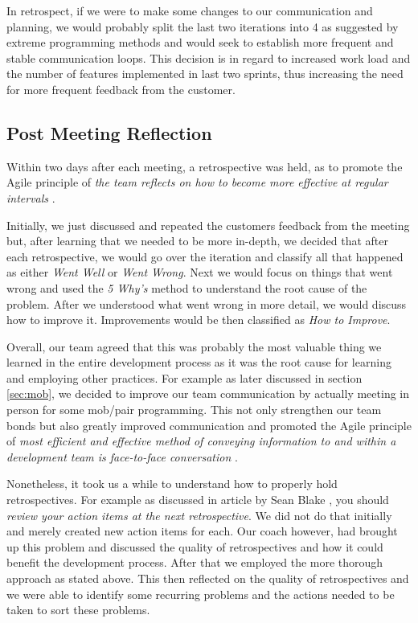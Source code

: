 \documentclass{l3proj}
\begin{document}
        In retrospect, if we were to make some changes to our communication and planning, we would probably split the last two iterations into 4 as suggested by extreme programming methods \cite{ep} and would seek to establish more frequent and stable communication loops. This decision is in regard to increased work load and the number of features implemented in last two sprints, thus increasing the need for more frequent feedback from the customer.
        
        
    \subsection{Post Meeting Reflection}
    \label{sec:retrospectives}
        Within two days after each meeting, a retrospective was held, as to promote the Agile principle of \textit{the team reflects on how to become more effective at regular intervals} \cite{manifesto}.

        Initially, we just discussed and repeated the customers feedback from the meeting but, after learning that we needed to be more in-depth, we decided that after each retrospective, we would go over the iteration and classify all that happened as either \textit{Went Well} or \textit{Went Wrong}. Next we would focus on things that went wrong and used the \textit{5 Why's} \cite{whys} method to understand the root cause of the problem. After we understood what went wrong in more detail, we would discuss how to improve it. Improvements would be then classified as \textit{How to Improve}.
        

        

        Overall, our team agreed that this was probably the most valuable thing we learned in the entire development process as it was the root cause for learning and employing other practices. For example as later discussed in section \ref{sec:mob}, we decided to improve our team communication by actually meeting in person for some mob/pair programming. This not only strengthen our team bonds but also greatly improved communication and promoted the Agile principle of \textit{most efficient and effective method of conveying information to and within a development team is face-to-face conversation} \cite{manifesto}.

        Nonetheless, it took us a while to understand how to properly hold retrospectives. For example as discussed in article by Sean Blake \cite{retro}, you should \textit{review your action items at the next retrospective}. We did not do that initially and merely created new action items for each. Our coach however, had brought up this problem and discussed the quality of retrospectives and how it could benefit the development process. After that we employed the more thorough approach as stated above. This then reflected on the quality of retrospectives and we were able to identify some recurring problems and the actions needed to be taken to sort these problems. 
\end{document}
